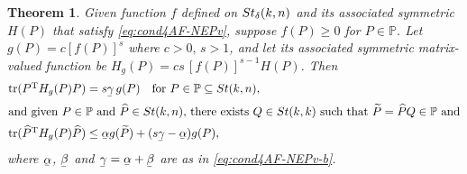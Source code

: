 \documentclass[11pt]{article}
\def\bbP{\mathbb{P}}
\def\scrH{\mathscr{H}}
\def\wtd{\widetilde}
\def\what{\widehat}
\newcommand\munderbar[1]{%
  \underaccent{\bar}{#1}}
\newcommand\STM[2]{{\rm St}(#1,#2)}
\newcommand\STMnbr{{\rm St}_{\delta}(k,n)}
\DeclareMathOperator{\tr}{tr}
\DeclareMathOperator{\T}{T}
\def\Blue{\textcolor{blue}}
\newtheorem{theorem}{Theorem}[section]
\theoremstyle{definition}
\numberwithin{equation}{section}
\begin{document}

\begin{theorem}\label{thm:cond4set2-pow-induced}
Given function $f$ defined on $\STMnbr$ and its associated symmetric $H(P)$ that satisfy \eqref{eq:cond4AF-NEPv},
suppose $f(P)\ge 0$ for $P\in\bbP$. Let $g(P)=c[f(P)]^s$ where $c>0,\,s>1$,
and let its associated symmetric matrix-valued function be $H_g(P)=cs\,[f(P)]^{s-1}H(P)$. Then
\begin{subequations}\label{eq:cond4set1-pow-induced:H(P)}
\begin{align}
\tr(P^{\T}H_g(P)P)&=s\munderbar\gamma\, g(P)\quad\mbox{for $P\in\bbP\subseteq\STM{k}{n}$},
          \label{eq:induced4pow-diff-eq:H(P)}\\
\intertext{and given $P\in\bbP$ and $\what P\in\STM{k}{n}$, there exists $Q\in\STM{k}{k}$ such
that $\wtd P=\what PQ\in\bbP$ and}
\tr(\what P^{\T} H_g(P)\what P)&\le \munderbar\alpha g(\wtd P)+(s\munderbar\gamma-\munderbar\alpha) g(P),
          \label{eq:induced-regularity4pow-diff-eq:H(P)}
\end{align}
\end{subequations}
where $\munderbar\alpha$, $\munderbar\beta$ and $\munderbar\gamma=\munderbar\alpha+\munderbar\beta$ are as in  \eqref{eq:cond4AF-NEPv-b}.
\end{theorem}
\end{document}
